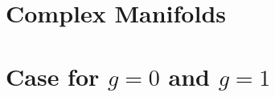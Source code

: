 \documentclass[a4paper, 8pt, notitlepage]{extreport}
\begin{document}
    

    \chapter{Complex Manifolds}
    
    
    

    \chapter{Case for $g=0$ and $g=1$}

    \printbibliography
\end{document}
